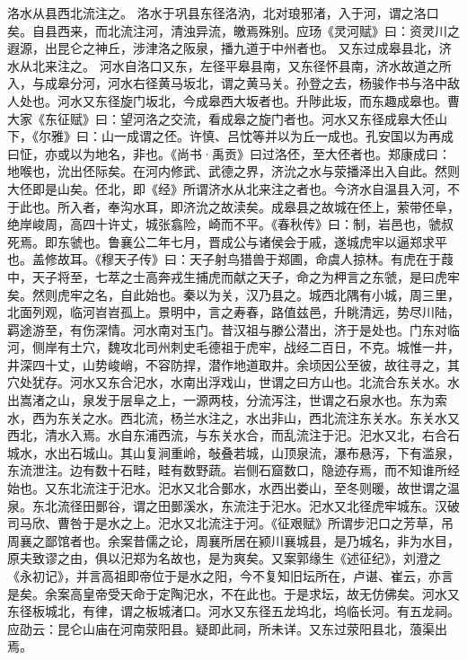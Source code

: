 \documentclass[12pt,UTF8]{ctexbook}
\begin{document}
洛水从县西北流注之。
洛水于巩县东径洛汭，北对琅邪渚，入于河，谓之洛口矣。自县西来，而北流注河，清浊异流，皦焉殊别。应玚《灵河赋》曰：资灵川之遐源，出昆仑之神丘，涉津洛之阪泉，播九道于中州者也。
又东过成皋县北，济水从北来注之。
河水自洛口又东，左径平皋县南，又东径怀县南，济水故道之所入，与成皋分河，河水右径黄马坂北，谓之黄马关。孙登之去，杨骏作书与洛中敌人处也。河水又东径旋门坂北，今成皋西大坂者也。升陟此坂，而东趣成皋也。曹大家《东征赋》曰：望河洛之交流，看成皋之旋门者也。河水又东径成皋大伾山下，《尔雅》曰：山一成谓之伾。许慎、吕忱等并以为丘一成也。孔安国以为再成曰怔，亦或以为地名，非也。《尚书·禹贡》曰过洛伾，至大伾者也。郑康成曰：地喉也，沇出伾际矣。在河内修武、武德之界，济沇之水与荥播泽出入自此。然则大伾即是山矣。伾北，即《经》所谓济水从北来注之者也。今济水自温县入河，不于此也。所入者，奉沟水耳，即济沇之故渎矣。成皋县之故城在伾上，萦带伾阜，绝岸峻周，高四十许丈，城张翕险，崎而不平。《春秋传》曰：制，岩邑也，虢叔死焉。即东虢也。鲁襄公二年七月，晋成公与诸侯会于戚，遂城虎牢以逼郑求平也。盖修故耳。《穆天子传》曰：天子射鸟猎兽于郑圃，命虞人掠林。有虎在于葭中，天子将至，七萃之士高奔戎生捕虎而献之天子，命之为柙言之东虢，是曰虎牢矣。然则虎牢之名，自此始也。秦以为关，汉乃县之。城西北隅有小城，周三里，北面列观，临河岧岧孤上。景明中，言之寿春，路值兹邑，升眺清远，势尽川陆，羁途游至，有伤深情。河水南对玉门。昔汉祖与滕公潜出，济于是处也。门东对临河，侧岸有土穴，魏攻北司州刺史毛德祖于虎牢，战经二百日，不克。城惟一井，井深四十丈，山势峻峭，不容防捍，潜作地道取井。余顷因公至彼，故往寻之，其穴处犹存。河水又东合汜水，水南出浮戏山，世谓之曰方山也。北流合东关水。水出嵩渚之山，泉发于层阜之上，一源两枝，分流泻注，世谓之石泉水也。东为索水，西为东关之水。西北流，杨兰水注之，水出非山，西北流注东关水。东关水又西北，清水入焉。水自东浦西流，与东关水合，而乱流注于汜。汜水又北，右合石城水，水出石城山。其山复涧重岭，敧叠若城，山顶泉流，瀑布悬泻，下有滥泉，东流泄注。边有数十石畦，畦有数野蔬。岩侧石窟数口，隐迹存焉，而不知谁所经始也。又东北流注于汜水。汜水又北合鄤水，水西出娄山，至冬则暖，故世谓之温泉。东北流径田鄤谷，谓之田鄤溪水，东流注于汜水。汜水又北径虎牢城东。汉破司马欣、曹咎于是水之上。汜水又北流注于河。《征艰赋》所谓步汜口之芳草，吊周襄之鄙馆者也。余案昔儒之论，周襄所居在颍川襄城县，是乃城名，非为水目，原夫致谬之由，俱以汜郑为名故也，是为爽矣。又案郭缘生《述征纪》，刘澄之《永初记》，并言高祖即帝位于是水之阳，今不复知旧坛所在，卢谌、崔云，亦言是矣。余案高皇帝受天命于定陶汜水，不在此也。于是求坛，故无仿佛矣。河水又东径板城北，有律，谓之板城渚口。河水又东径五龙坞北，坞临长河。有五龙祠。应劭云：昆仑山庙在河南荥阳县。疑即此祠，所未详。又东过荥阳县北，蒗渠出焉。
\end{document}
